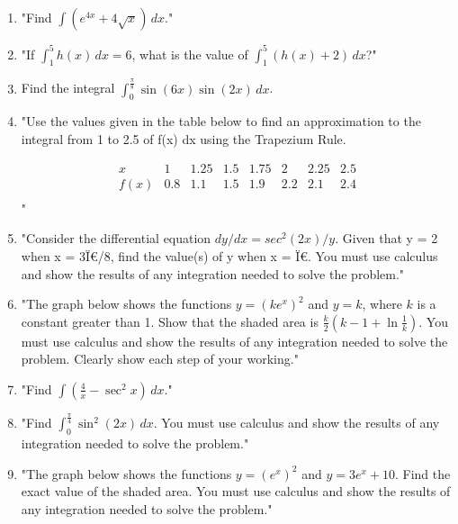 \documentclass{article}
\begin{document}
\begin{enumerate}
\vspace{3cm}
\item "Find \(\int (e^{4x} + 4\sqrt{x}) \, dx\)."
\vspace{3cm}
\item "If \(\int_1^5 h(x) \, dx = 6\), what is the value of \(\int_1^5 (h(x) + 2) \, dx\)?"
\vspace{3cm}
\item Find the integral \(\int_0^{\frac{\pi}{8}} \sin(6x) \sin(2x) \, dx\).
\vspace{3cm}
\item "Use the values given in the table below to find an approximation to the integral from 1 to 2.5 of f(x) dx using the Trapezium Rule.

\[
\begin{array}{c|ccccccc}
x & 1 & 1.25 & 1.5 & 1.75 & 2 & 2.25 & 2.5 \\
\hline
f(x) & 0.8 & 1.1 & 1.5 & 1.9 & 2.2 & 2.1 & 2.4 \\
\end{array}
\]"
\vspace{3cm}
\item "Consider the differential equation \(dy/dx = sec^2(2x) / y\). Given that y = 2 when x = 3Ï€/8, find the value(s) of y when x = Ï€. You must use calculus and show the results of any integration needed to solve the problem."
\vspace{3cm}
\item "The graph below shows the functions \( y = (ke^x)^2 \) and \( y = k \), where \( k \) is a constant greater than 1. Show that the shaded area is \(\frac{k}{2} \left( k - 1 + \ln \frac{1}{k} \right)\). You must use calculus and show the results of any integration needed to solve the problem. Clearly show each step of your working."
\vspace{3cm}
\item "Find \(\int \left( \frac{4}{x} - \sec^2 x \right) \, dx\)."
\vspace{3cm}
\item "Find \(\int_{0}^{\frac{\pi}{4}} \sin^2(2x) \, dx\). You must use calculus and show the results of any integration needed to solve the problem."
\vspace{3cm}
\item "The graph below shows the functions \( y = (e^x)^2 \) and \( y = 3e^x + 10 \). Find the exact value of the shaded area. You must use calculus and show the results of any integration needed to solve the problem."
\vspace{3cm}

\end{enumerate}
\end{document}

